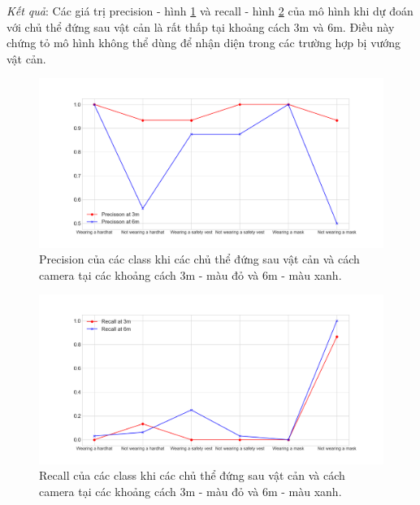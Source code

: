 \emph{Kết quả}: Các giá trị precision - hình \ref{fig:3_6_precision} và recall - hình \ref{fig:3_6_recall} của mô hình khi dự đoán với chủ thể đứng sau vật cản là rất thấp tại khoảng cách 3m và 6m. Điều này chứng tỏ mô hình không thể dùng để nhận diện trong các trường hợp bị vướng vật cản.
\begin{figure}[ht!]
	\centerline{\includegraphics[scale=0.5]{images/3_6_precision.png}}
  	\caption{Precision của các class khi các chủ thể đứng sau vật cản và cách camera tại các khoảng cách 3m - màu đỏ và 6m - màu xanh.}
  	\label{fig:3_6_precision}
\end{figure}
\begin{figure}[ht!]
	\centerline{\includegraphics[scale=0.5]{images/3_6_recall.png}}
  	\caption{Recall của các class khi các chủ thể đứng sau vật cản và cách camera tại các khoảng cách 3m - màu đỏ và 6m - màu xanh.}
  	\label{fig:3_6_recall}
\end{figure}